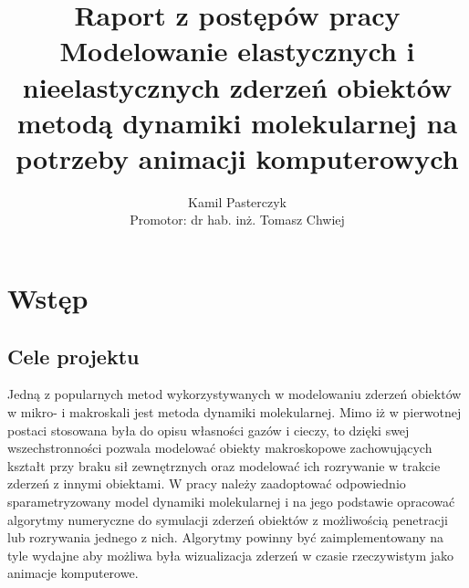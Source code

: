 \documentclass[12pt, letterpaper]{report}
\title{
    Raport z postępów pracy \\
    \large Modelowanie elastycznych i nieelastycznych
    zderzeń obiektów\\
    metodą dynamiki molekularnej na potrzeby animacji
    komputerowych
}
\author{
    Kamil Pasterczyk \\
    \small Promotor: dr hab. inż. Tomasz Chwiej
}
\begin{document}
\maketitle
\tableofcontents

\chapter{Wstęp}
    \section{Cele projektu}
    Jedną z popularnych metod wykorzystywanych w modelowaniu zderzeń obiektów w mikro- i makroskali jest 
    metoda dynamiki molekularnej. Mimo iż w pierwotnej postaci stosowana była do opisu własności gazów i 
    cieczy, to dzięki swej wszechstronności pozwala modelować obiekty makroskopowe zachowujących kształt 
    przy braku sił zewnętrznych oraz modelować ich rozrywanie w trakcie zderzeń z innymi obiektami. W pracy 
    należy zaadoptować odpowiednio sparametryzowany model dynamiki molekularnej i na jego podstawie opracować 
    algorytmy numeryczne do symulacji zderzeń obiektów z możliwością penetracji lub rozrywania jednego z nich. 
    Algorytmy powinny być zaimplementowany na tyle wydajne aby możliwa była wizualizacja zderzeń w czasie 
    rzeczywistym jako animacje komputerowe.
\end{document}
